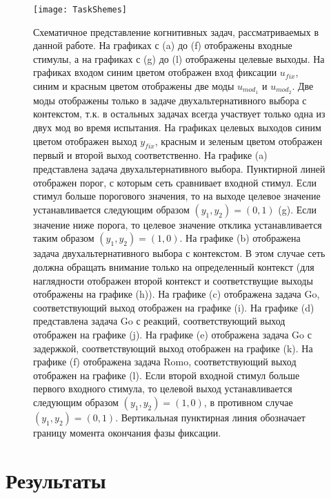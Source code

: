 \documentclass{article}
\begin{document}
\begin{figure} \label{fig:TaskShemes}
  \begin{center}
    \texttt{[image: TaskShemes]}
    \caption{
      Схематичное представление когнитивных задач, рассматриваемых в данной работе. На графиках с (a) до (f) отображены входные стимулы, а на графиках с (g) до (l) отображены целевые выходы. На графиках входом синим цветом отображен вход фиксации $u_{fix}$, синим и красным цветом отображены две моды $u_{mod_1}$ и $u_{mod_2}$. Две моды отображены только в задаче двухальтернативного выбора с контекстом, т.к. в остальных задачах всегда участвует только одна из двух мод во время испытания. На графиках целевых выходов синим цветом отображен выход $y_{fix}$, красным и зеленым цветом отображен первый и второй выход соответственно. На графике (a) представлена задача двухальтернативного выбора. Пунктирной линей отображен порог, с которым сеть сравнивает входной стимул. Если стимул больше порогового значения, то на выходе целевое значение устанавливается следующим образом $(y_1, y_2) = (0, 1)$ (g). Если значение ниже порога, то целевое значение отклика устанавливается таким образом $(y_1, y_2) = (1, 0)$. На графике (b) отображена задача двухальтернативного выбора с контекстом. В этом случае сеть должна обращать внимание только на определенный контекст (для наглядности отображен второй контекст и соответствущие выходы отображены на графике (h)). На графике (c) отображена задача Go, соответствующий выход отображен на графике (i). На графике (d) представлена задача Go с реакций, соответствующий выход отображен на графике (j). На графике (e) отображена задача Go с задержкой, соответствующий выход отображен на графике (k). На графике (f) отображена задача Romo, соответствующий выход отображен на графике (l). Если второй входной стимул больше первого входного стимула, то целевой выход устанавливается следующим образом $(y_1, y_2) = (1, 0)$, в противном случае $(y_1, y_2) = (0, 1)$. Вертикальная пунктирная линия обозначает границу момента окончания фазы фиксации.
    }
  \end{center}
\end{figure}

\newpage

\section{Результаты}
\end{document}
